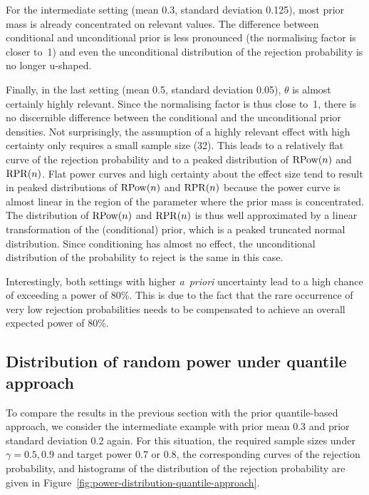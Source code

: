 \documentclass{article}
\begin{document}
For the intermediate setting (mean 0.3, standard deviation 0.125), most prior mass is already concentrated on relevant values.
The difference between conditional and unconditional prior is less pronounced (the normalising factor is closer to~1) and even the unconditional distribution of the rejection probability is no longer u-shaped.

Finally, in the last setting (mean 0.5, standard deviation 0.05), $\theta$ is almost certainly highly relevant.
Since the normalising factor is thus close to~1, there is no discernible difference between the conditional and the unconditional prior densities.
Not surprisingly, the assumption of a highly relevant effect with high certainty only requires a small sample size (32).
This leads to a relatively flat curve of the rejection probability and to a peaked distribution of $\operatorname{RPow}({ n })$ and $\operatorname{RPR}(n)$.
Flat power curves and high certainty about the effect size tend to result in peaked distributions of $\operatorname{RPow}({ n })$ and $\operatorname{RPR}(n)$ because the power curve is almost linear in the region of the parameter where the prior mass is concentrated.
The distribution of $\operatorname{RPow}({ n })$ and $\operatorname{RPR}(n)$ is thus well approximated by a linear transformation of the (conditional) prior, which is a peaked truncated normal distribution.
Since conditioning has almost no effect, the unconditional distribution of the probability to reject is the same in this case.

Interestingly, both settings with higher \textit{a~priori} uncertainty lead to a high chance of exceeding a power of 80\%.
This is due to the fact that the rare occurrence of very low rejection probabilities needs to be compensated to achieve an overall expected power of 80\%.



\subsection{Distribution of random power under quantile approach}

To compare the results in the previous section with the prior quantile-based approach, we consider the intermediate example with prior mean 0.3 and prior standard deviation 0.2 again.
For this situation, the required sample sizes under $\gamma=0.5,0.9$ and target power $0.7$ or $0.8$, the corresponding curves of the rejection probability, and histograms of the distribution of the rejection probability are given in Figure~\ref{fig:power-distribution-quantile-approach}.
\end{document}
